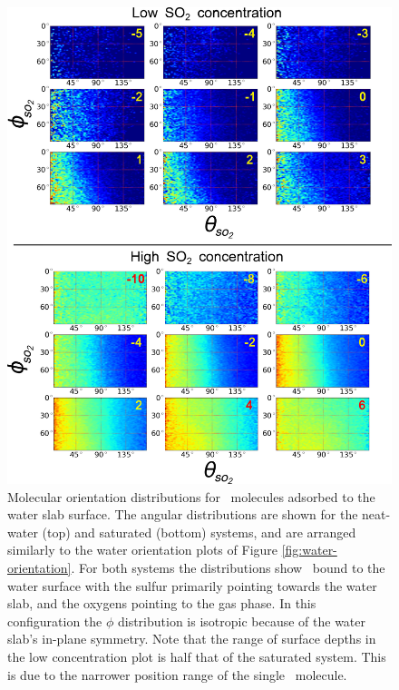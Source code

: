 
\begin{figure}[h!]
	\begin{center}
		\includegraphics[scale=1.0]{images/so2-angles/theta-phi.png}
		\caption{Molecular orientation distributions for \suldiox~molecules adsorbed to the water slab surface. The angular distributions are shown for the neat-water (top) and saturated (bottom) systems, and are arranged similarly to the water orientation plots of Figure \ref{fig:water-orientation}. For both systems the distributions show \suldiox~bound to the water surface with the sulfur primarily pointing towards the water slab, and the oxygens pointing to the gas phase. In this configuration the $\phi$ distribution is isotropic because of the water slab's in-plane symmetry. Note that the range of surface depths in the low concentration plot is half that of the saturated system. This is due to the narrower position range of the single \suldiox~molecule.}
		\label{fig:so2-orientation}
	\end{center}
\end{figure}
